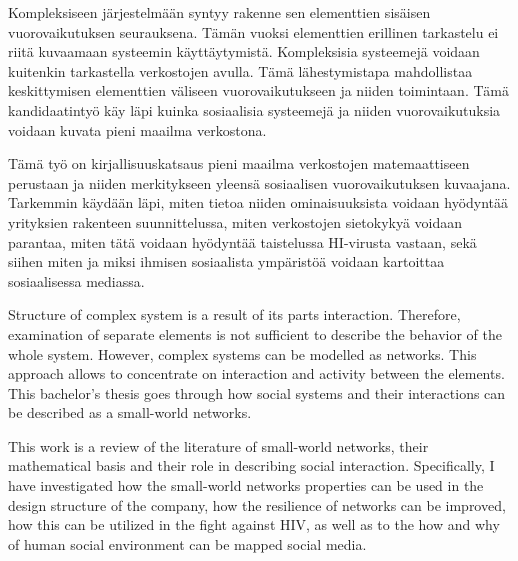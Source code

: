 \documentclass[finnish,12pt,a4paper,pdftex,elec,utf8]{aaltothesis}
\begin{document}
\begin{abstractpage}[finnish]
Kompleksiseen järjestelmään syntyy rakenne sen elementtien sisäisen vuorovaikutuksen seurauksena. Tämän vuoksi elementtien erillinen tarkastelu ei riitä kuvaamaan systeemin käyttäytymistä. Kompleksisia systeemejä voidaan kuitenkin tarkastella verkostojen avulla. Tämä lähestymistapa mahdollistaa keskittymisen elementtien väliseen vuorovaikutukseen ja niiden toimintaan. Tämä kandidaatintyö käy läpi kuinka sosiaalisia systeemejä ja niiden vuorovaikutuksia voidaan kuvata pieni maailma verkostona.

Tämä työ on kirjallisuuskatsaus pieni maailma verkostojen matemaattiseen perustaan ja niiden merkitykseen yleensä sosiaalisen vuorovaikutuksen kuvaajana. Tarkemmin käydään läpi, miten tietoa niiden ominaisuuksista voidaan hyödyntää yrityksien rakenteen suunnittelussa, miten verkostojen sietokykyä voidaan parantaa, miten tätä voidaan hyödyntää taistelussa HI-virusta vastaan, sekä siihen miten ja miksi ihmisen sosiaalista ympäristöä voidaan kartoittaa sosiaalisessa mediassa.  

\end{abstractpage}

\newpage
%
\begin{abstractpage}[english]
Structure of complex system is a result of its parts interaction. Therefore, examination of separate elements is not sufficient to describe the behavior of the whole system. However, complex systems can be modelled as networks. This approach allows to concentrate on interaction and activity between the elements. This bachelor's thesis goes through how social systems and their interactions can be described as a small-world networks.

This work is a review of the literature of small-world networks, their mathematical basis and their role in describing social interaction. Specifically, I have investigated how the small-world networks properties can be used in the design structure of the company, how the resilience of networks can be improved, how this can be utilized in the fight against HIV, as well as to the how and why of human social environment can be mapped social media.
\end{abstractpage}
\end{document}
